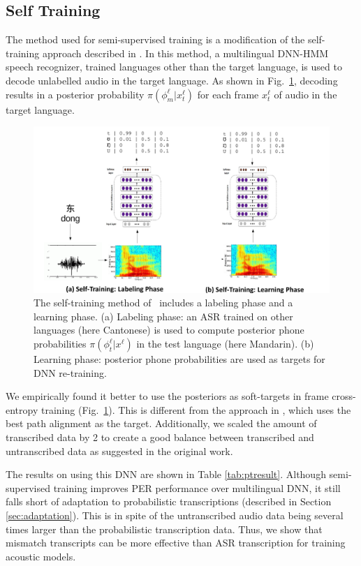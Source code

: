 \subsection{Self Training}
\label{sec:selftraining}

The method used for semi-supervised training is a modification of the
self-training approach described in \cite{vesely2013-semi}. In this
method, a multilingual DNN-HMM speech recognizer, trained languages
other than the target language, is used to decode unlabelled audio in
the target language.  As shown in Fig.~\ref{fig:fig_hager}, decoding
results in a posterior probability $\pi(\phi_m^\ell|x_t^\ell)$ for
each frame $x_t^\ell$ of audio in the target language.

\begin{figure}
  \centerline{\includegraphics[width=5in]{../figs/fig_hager.png}}
  \caption{The self-training method of~\cite{vesely2013-semi} includes
    a labeling phase and a learning phase.  (a) Labeling phase: an ASR
    trained on other languages (here Cantonese) is used to compute
    posterior phone probabilities $\pi(\phi_t^\ell|x^\ell)$ in the
    test language (here Mandarin). (b) Learning phase: posterior phone
    probabilities are used as targets for DNN re-training.}
  \label{fig:fig_hager}
\end{figure}

We empirically found it better to use the posteriors as soft-targets
in frame cross-entropy training (Fig.~\ref{fig:fig_hager}). This is
different from the approach in \cite{vesely2013-semi}, which uses the
best path alignment as the target. Additionally, we scaled the amount
of transcribed data by 2 to create a good balance between transcribed
and untranscribed data as suggested in the original work.

The results on using this DNN are shown in Table \ref{tab:ptresult}. Although
semi-supervised training improves PER performance over multilingual DNN, it
still falls short of adaptation to probabilistic transcriptions (described in
Section \ref{sec:adaptation}). This is in spite of the untranscribed audio data
being several times larger than the probabilistic transcription data. Thus, we
show that mismatch transcripts can be more effective than ASR transcription for
training acoustic models.

